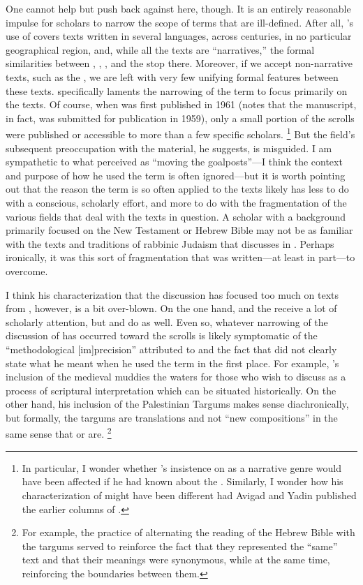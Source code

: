 One cannot help but push back against \vermes here, though. It is an entirely reasonable impulse for scholars to narrow the scope of terms that are ill-defined. After all, \vermes's use of \rwb covers texts written in several languages, across centuries, in no particular geographical region, and, while all the texts are ``narratives,'' the formal similarities between \ga, \antiquities, \jub, and the \pTarg stop there. Moreover, if we accept non-narrative texts, such as the \templescroll, we are left with very few unifying formal features between these texts. \vermes specifically laments the narrowing of the term \rwb to focus primarily on the \dss texts. Of course, when  was first published in 1961 (\vermes notes that the manuscript, in fact, was submitted for publication in 1959), only a small portion of the scrolls were published or accessible to more than a few specific scholars.%
    \footnote{%
        In particular, I wonder whether \vermes's insistence on \rwb as a narrative genre would have been affected if he had known about the \templescroll. Similarly, I wonder how his characterization of \ga might have been different had Avigad and Yadin published the earlier columns of \ga.}
But the field's subsequent preoccupation with the \qumran material, he suggests, is misguided. I am sympathetic to what \vermes perceived as ``moving the goalposts''---I think the context and purpose of how he used the term \rwb is often ignored---but it is worth pointing out that the reason the term \rwb is so often applied to the \qumran texts likely has less to do with a conscious, scholarly effort, and more to do with the fragmentation of the various fields that deal with the texts in question. A scholar with a background primarily focused on the New Testament or Hebrew Bible may not be as familiar with the texts and traditions of rabbinic Judaism that \vermes discusses in . Perhaps ironically, it was this sort of fragmentation that  was written---at least in part---to overcome.

I think his characterization that the discussion has focused too much on texts from \qumran, however, is a bit over-blown. On the one hand, \ga and the \templescroll receive a lot of scholarly attention, but \jub and \antiquities do as well. Even so, whatever narrowing of the discussion of \rwb has occurred toward the \qumran scrolls is likely symptomatic of the ``methodological [im]precision'' attributed to  and the fact that \vermes did not clearly state what he meant when he used the term in the first place. For example, \vermes's inclusion of the medieval \sefer muddies the waters for those who wish to discuss \rwb as a process of scriptural interpretation which can be situated historically. On the other hand, his inclusion of the Palestinian Targums makes sense diachronically, but formally, the targums are translations and not ``new compositions'' in the same sense that \jub or \ga are.%
    \footnote{%
        For example, the practice of alternating the reading of the Hebrew Bible with the targums served to reinforce the fact that they represented the ``same'' text and that their meanings were synonymous, while at the same time, reinforcing the boundaries between them.}

